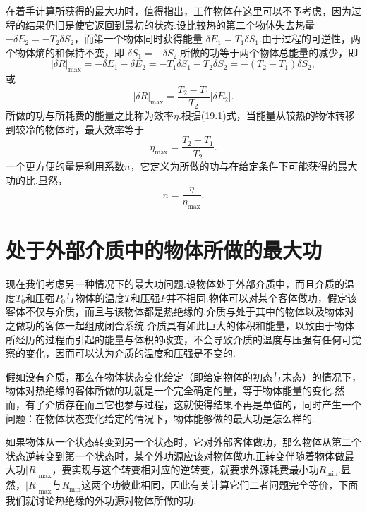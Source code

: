 在着手计算所获得的最大功时，值得指出，工作物体在这里可以不予考虑，因为过程的结果仍旧是使它返回到最初的状态.设比较热的第二个物体失去热量
$-\delta E_2=-T_2\delta S_2$，而第一个物体同时获得能量
$\delta E_1=T_1\delta S_1$.由于过程的可逆性，两个物体熵的和保持不变，即
$\delta S_1=-\delta S_2$.所做的功等于两个物体总能量的减少，即
\begin{equation*}
  |\delta R|_{\max}
  =-\delta E_1-\delta E_2
  =-T_1\delta S_1-T_2\delta S_2
  =-(T_2-T_1)\delta S_2,
\end{equation*}
或
\begin{equation}
  |\delta R|_{\max}
  =\frac{T_2-T_1}{T_2}|\delta E_2|.
\end{equation}
所做的功与所耗费的能量之比称为效率$\eta$.根据(19.1)式，当能量从较热的物体转移到较冷的物体时，最大效率等于
\begin{equation}
  \eta_{\max}=\frac{T_2-T_1}{T_2}.
\end{equation}
一个更方便的量是利用系数$n$，它定义为所做的功与在给定条件下可能获得的最大功的比.显然，
\begin{equation*}
  n=\frac{\eta}{\eta_{\max}}.
\end{equation*}

\section{处于外部介质中的物体所做的最大功}

现在我们考虑另一种情况下的最大功问题.设物体处于外部介质中，而且介质的温度$T_0$和压强$P_0$与物体的温度$T$和压强$P$并不相同.物体可以对某个客体做功，假定该客体不仅与介质，而且与该物体都是热绝缘的.介质与处于其中的物体以及物体对之做功的客体一起组成闭合系统.介质具有如此巨大的体积和能量，以致由于物体所经历的过程而引起的能量与体积的改变，不会导致介质的温度与压强有任何可觉察的变化，因而可以认为介质的温度和压强是不变的.

假如没有介质，那么在物体状态变化给定（即给定物体的初态与末态）的情况下，物体对热绝缘的客体所做的功就是一个完全确定的量，等于物体能量的变化.然而，有了介质存在而且它也参与过程，这就使得结果不再是单值的，同时产生一个问题：在物体状态变化给定的情况下，物体能够做的最大功是怎么样的.

如果物体从一个状态转变到另一个状态时，它对外部客体做功，那么物体从第二个状态逆转变到第一个状态时，某个外功源应该对物体做功.正转变伴随着物体做最大功$|R|_{\max}$，要实现与这个转变相对应的逆转变，就要求外源耗费最小功$R_{\min}$.显然，$|R|_{\max}$与$R_{\min}$这两个功彼此相同，因此有关计算它们二者问题完全等价，下面我们就讨论热绝缘的外功源对物体所做的功.

